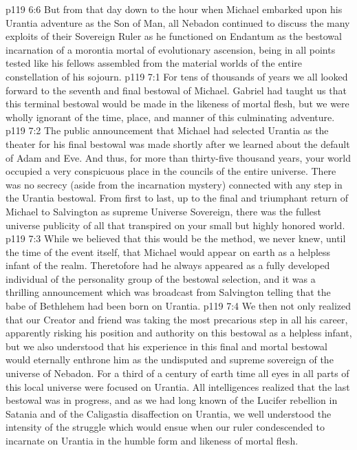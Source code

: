 \vs p119 6:6 But from that day down to the hour when Michael embarked upon his Urantia adventure as the Son of Man, all Nebadon continued to discuss the many exploits of their Sovereign Ruler as he functioned on Endantum as the bestowal incarnation of a morontia mortal of evolutionary ascension, being in all points tested like his fellows assembled from the material worlds of the entire constellation of his sojourn.
\vs p119 7:1 For tens of thousands of years we all looked forward to the seventh and final bestowal of Michael. Gabriel had taught us that this terminal bestowal would be made in the likeness of mortal flesh, but we were wholly ignorant of the time, place, and manner of this culminating adventure.
\vs p119 7:2 The public announcement that Michael had selected Urantia as the theater for his final bestowal was made shortly after we learned about the default of Adam and Eve. And thus, for more than thirty\hyp{}five thousand years, your world occupied a very conspicuous place in the councils of the entire universe. There was no secrecy (aside from the incarnation mystery) connected with any step in the Urantia bestowal. From first to last, up to the final and triumphant return of Michael to Salvington as supreme Universe Sovereign, there was the fullest universe publicity of all that transpired on your small but highly honored world.
\pc \vs p119 7:3 While we believed that this would be the method, we never knew, until the time of the event itself, that Michael would appear on earth as a helpless infant of the realm. Theretofore had he always appeared as a fully developed individual of the personality group of the bestowal selection, and it was a thrilling announcement which was broadcast from Salvington telling that the babe of Bethlehem had been born on Urantia.
\vs p119 7:4 We then not only realized that our Creator and friend was taking the most precarious step in all his career, apparently risking his position and authority on this bestowal as a helpless infant, but we also understood that his experience in this final and mortal bestowal would eternally enthrone him as the undisputed and supreme sovereign of the universe of Nebadon. For a third of a century of earth time all eyes in all parts of this local universe were focused on Urantia. All intelligences realized that the last bestowal was in progress, and as we had long known of the Lucifer rebellion in Satania and of the Caligastia disaffection on Urantia, we well understood the intensity of the struggle which would ensue when our ruler condescended to incarnate on Urantia in the humble form and likeness of mortal flesh.
